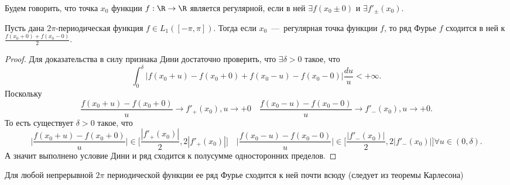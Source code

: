\begin{definition}
    Будем говорить, что точка $x_0$ функции $f: \R \to \R$ является регулярной, если в ней $\exists f(x_0 \pm 0)$ и $\exists f'_\pm(x_0)$.
\end{definition}
\begin{corollary}
    Пусть дана $2\pi$-периодическая функция $f \in L_1([-\pi, \pi])$. Тогда если $x_0$~---~регулярная точка функции $f$, то ряд Фурье $f$ сходится в ней к $\frac{f(x_0 + 0) + f(x_0 - 0)}{2}$.
\end{corollary}
\begin{proof}
    Для доказательства в силу признака Дини достаточно проверить, что $\exists \delta > 0$ такое, что \[
                                                                                                          \int_0^\delta \bigg|f(x_0 + u) - f(x_0 + 0) + f(x_0 - u) - f(x_0 - 0)\bigg|\dfrac{du}{u} < +\infty.
    \]
    Поскольку \[
                  \dfrac{f(x_0 + u) - f(x_0 + 0)}{u} \rightarrow f'_+(x_0), u \rightarrow +0 \quad  \dfrac{f(x_0 - u) - f(x_0 - 0)}{u} \rightarrow f'_-(x_0), u \rightarrow +0.
    \]
    То есть существует $\delta > 0$ такое, что
    \[
                                                   \biggr|\dfrac{f(x_0 + u) - f(x_0 + 0)}{u}\biggr| \in \biggr[\dfrac{|f'_+(x_0)|}{2}, 2|f'_+(x_0)|\biggr] \quad \biggr|\dfrac{f(x_0 - u) - f(x_0 - 0)}{u}\biggr| \in \biggr[\dfrac{|f'_-(x_0)|}{2}, 2|f'_-(x_0)|\biggr] \forall u \in (0, \delta).
    \]
    А значит выполнено условие Дини и ряд сходится к полусумме односторонних пределов.
\end{proof}

\begin{fact}
        Для любой непрерывной $2\pi$ периодической функции ее ряд Фурье сходится к ней почти всюду (следует из теоремы Карлесона)
\end{fact}



